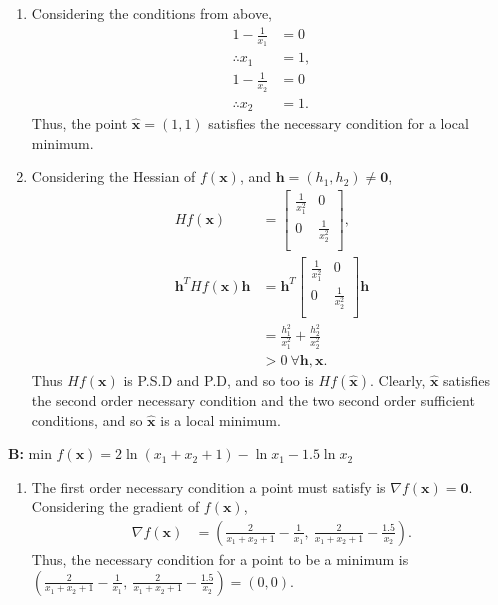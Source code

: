 \documentclass[a4paper,11pt]{article}
\newcommand{\ds}{\displaystyle}
\begin{document}
{{\begin{enumerate}[leftmargin=*]
\begin{enumerate}[label=\alph*)]
			\item Considering the conditions from above, 
				\begin{align*}
					1 - \frac{1}{x_1} & = 0 \\
					\therefore x_1 & = 1, \\
					1 - \frac{1}{x_2} & = 0 \\
					\therefore x_2 & = 1.
				\end{align*}
				Thus, the point $\ds{\hat{\mathbf{x}} = (1,1)}$ satisfies the necessary condition for a local minimum.
			\item Considering the Hessian of $\ds{f(\mathbf{x})}$, and $\ds{\mathbf{h} = (h_1,h_2) \neq \mathbf{0}}$,
				\begin{align*}
					Hf(\mathbf{x}) & =
					\begin{bmatrix}
						\frac{1}{x_1^2} & 0 \\
						0 & \frac{1}{x_2^2} \\
					\end{bmatrix}, \\
					\mathbf{h}^T Hf(\mathbf{x})\mathbf{h} & = \mathbf{h}^T
					\begin{bmatrix}
						\frac{1}{x_1^2} & 0 \\
						0 & \frac{1}{x_2^2} \\
					\end{bmatrix}\mathbf{h} \\
					& =\frac{h_1^2}{x_1^2} + \frac{h_2^2}{x_2^2} \\
					& > 0 \: \forall \mathbf{h},\mathbf{x}.
				\end{align*}
				Thus $\ds{Hf(\mathbf{x})}$ is P.S.D and P.D, and so too is $\ds{Hf(\hat{\mathbf{x}})}$. Clearly, $\ds{\hat{\mathbf{x}}}$ satisfies the second order necessary condition and the two second order sufficient conditions, and so $\ds{\hat{\mathbf{x}}}$ is a local minimum.
					

			\end{enumerate}
			\textbf{B:} min $\ds{f(\mathbf{x}) = 2\ln(x_1 + x_2+1) - \ln{x_1} - 1.5\ln{x_2}}$
			\begin{enumerate}[label=\alph*)]

				\item The first order necessary condition a point must satisfy is $\ds{\nabla f(\mathbf{x}) = \mathbf{0}}$. Considering the gradient of $\ds{f(\mathbf{x})}$,
					\begin{align*}
						\nabla f(\mathbf{x}) & = \left(\frac{2}{x_1+x_2+1} - \frac{1}{x_1}, \: \frac{2}{x_1+x_2+1}-\frac{1.5}{x_2}\right). 
					\end{align*}
					Thus, the necessary condition for a point to be a minimum is \\ $\ds{\left(\frac{2}{x_1+x_2+1} - \frac{1}{x_1}, \: \frac{2}{x_1+x_2+1}-\frac{1.5}{x_2}\right) = (0,0)}$.


\end{enumerate}
\end{enumerate}}}
\end{document}
